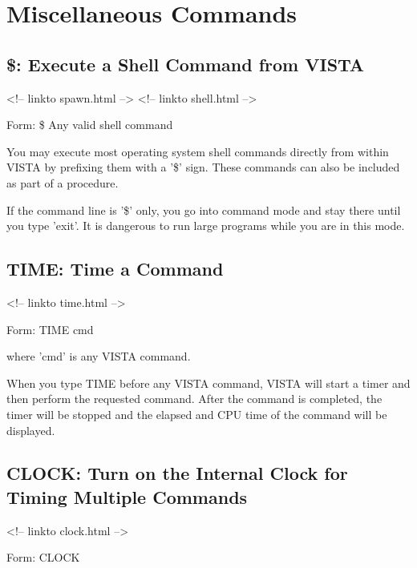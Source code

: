 \chapter{Miscellaneous Commands}

%
%

\section{\$: Execute a Shell Command from VISTA}
\begin{rawhtml}
<!-- linkto spawn.html -->
<!-- linkto shell.html -->
\end{rawhtml}
\begin{command}
  \item[Form: \$ Any valid shell command\hfill]{}
\end{command}

You may execute most operating system shell commands directly from within
VISTA by prefixing them with a '\$' sign.  These commands can also be
included as part of a procedure.

If the command line is '\$' only, you go into command mode and stay there
until you type 'exit'.  It is dangerous to run large programs while you are
in this mode.

\section{TIME: Time a Command}
\begin{rawhtml}
<!-- linkto time.html -->
\end{rawhtml}
\begin{command}
  \item[Form: TIME cmd\hfill]{}
\end{command}
where 'cmd' is any VISTA command.

When you type TIME before any VISTA command, VISTA will start a timer and then
perform the requested command.  After the command is completed, the timer will
be stopped and the elapsed and CPU time of the command will be displayed.

\section{CLOCK: Turn on the Internal Clock for Timing Multiple Commands}
\begin{rawhtml}
<!-- linkto clock.html -->
\end{rawhtml}
\begin{command}
  \item[Form: CLOCK\hfill]{}
\end{command}
 
